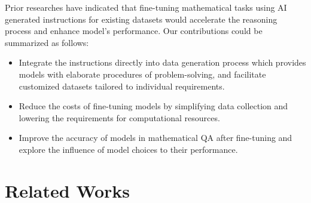 \documentclass[10pt]{article}
\begin{document}
Prior researches have indicated that fine-tuning mathematical tasks using AI generated instructions for existing datasets would accelerate the reasoning process and enhance model's performance. Our contributions could be summarized as follows:
\begin{itemize}
    \item Integrate the instructions directly into data generation process which provides models with elaborate procedures of problem-solving, and facilitate customized datasets tailored to individual requirements. 
    \item Reduce the costs of fine-tuning models by simplifying data collection and lowering the requirements for computational resources. 
    \item Improve the accuracy of models in mathematical QA after fine-tuning and explore the influence of model choices to their performance. 
\end{itemize}

\section{Related Works}
\end{document}
